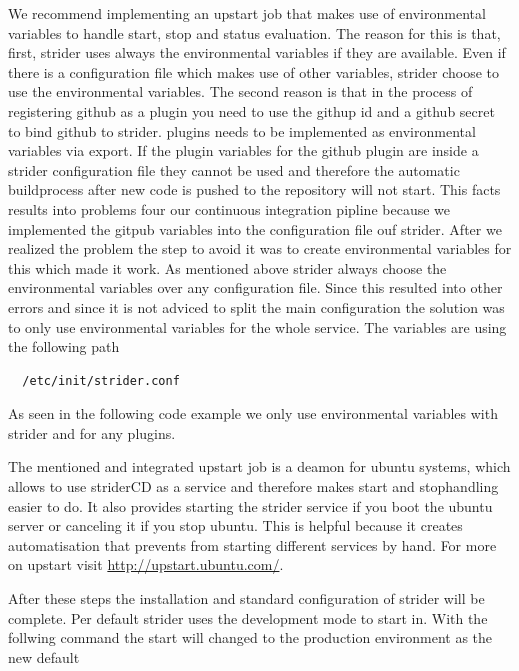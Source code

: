 We recommend implementing an upstart job that makes use of environmental variables to handle start, stop and status evaluation.
The reason for this is that, first, strider uses always the environmental variables if they are available. Even if there is a configuration
file which makes use of other variables, strider choose to use the environmental variables. The second reason is that in the process of
registering github as a plugin you need to use the githup id and a github secret to bind github to strider. plugins needs to be implemented
as environmental variables via export. If the plugin variables for the github plugin are inside a strider configuration file they cannot
be used and therefore the automatic buildprocess after new code is pushed to the repository will not start. This facts results into problems
four our continuous integration pipline because we implemented the gitpub variables into the configuration file ouf strider. After we realized
the problem the step to avoid it was to create environmental variables for this which made it work. As mentioned above strider always choose
the environmental variables over any configuration file. Since this resulted into other errors and since it is not adviced to split the
main configuration the solution was to only use environmental variables for the whole service. The variables are using the following path

\begin{lstlisting}
  /etc/init/strider.conf
\end{lstlisting}

As seen in the following code example we only use environmental variables with strider and for any plugins.



The mentioned and integrated upstart job is a deamon for ubuntu systems, which allows to use striderCD as a service and therefore makes start and
stophandling easier to do. It also provides starting the strider service if you boot the ubuntu server or canceling it if you
stop ubuntu. This is helpful because it creates automatisation that prevents from starting different services by hand. For more on
upstart visit \url{http://upstart.ubuntu.com/}.

After these steps the installation and standard configuration of strider will be complete. Per default strider uses the development mode to start in.
With the follwing command the start will changed to the production environment as the new default

